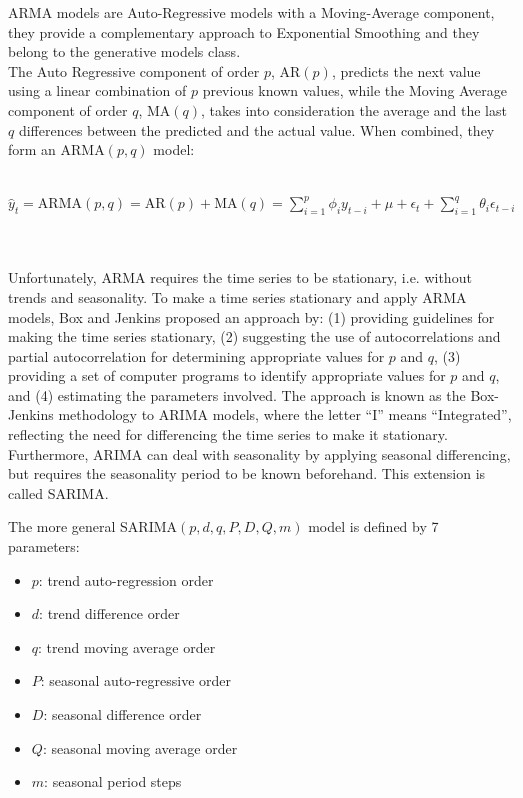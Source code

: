 \documentclass[a4paper, 12pt]{article} %
\begin{document}
	ARMA models are Auto-Regressive models with a Moving-Average component, they provide a complementary approach to Exponential Smoothing and they belong to the generative models class. \\
	The Auto Regressive component of order $p$, $\text{AR}(p)$, predicts the next value using a linear combination of $p$ previous known values, while the Moving Average component of order $q$, $\text{MA}(q)$, takes into consideration the average and the last $q$ differences between the predicted and the actual value.  When combined, they form an ARMA$(p, q)$ model:\\\\
	\centerline{$\hat{y}_{t} = \text{ARMA}(p, q) = \text{AR}(p) + \text{MA}(q)  = \sum_{i=1}^{p}\phi_i y_{t-i} + \mu + \epsilon_t + \sum_{i=1}^{q}\theta_i \epsilon_{t-i} $}\\\\
	Unfortunately, ARMA requires the time series to be stationary, i.e. without trends and seasonality. To make a time series stationary and apply ARMA models, Box and Jenkins \cite{BoxJenkins} proposed an approach by: (1) providing guidelines for making the time series stationary, (2)  suggesting the use of autocorrelations and partial autocorrelation for determining appropriate values for $p$ and $q$, (3) providing a set of computer programs to identify appropriate values for $p$ and $q$, and (4) estimating the parameters involved. The approach is known as the Box-Jenkins methodology to ARIMA models, where the letter ``I'' means ``Integrated'', reflecting the need for differencing the time series to make it stationary. Furthermore, ARIMA can deal with seasonality by applying seasonal differencing, but requires the seasonality period to be known beforehand. This extension is called SARIMA.
	
	The more general SARIMA$(p, d, q, P, D, Q, m)$ model is defined by 7 parameters:
	\begin{itemize}
		\item $p$: trend auto-regression order
		\item $d$: trend difference order
		\item $q$: trend moving average order
		\item $P$: seasonal auto-regressive order
		\item $D$: seasonal difference order
		\item $Q$: seasonal moving average order
		\item $m$: seasonal period steps
	\end{itemize}
\end{document}
